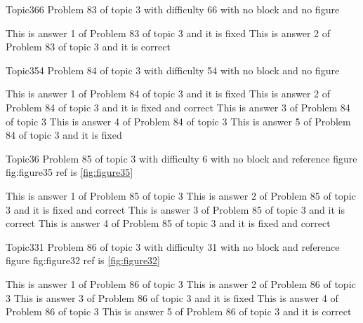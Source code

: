 \documentclass[master]{exam}
\begin{document}
\begin{problem}{Topic3}{66}
	Problem 83 of topic 3 with difficulty 66 with no block and no figure
	\begin{answers}
		\answer[fixed] This is answer 1 of Problem 83 of topic 3 and it is fixed
		\answer[correct] This is answer 2 of Problem 83 of topic 3 and it is correct
	\end{answers}
\end{problem}

\begin{problem}{Topic3}{54}
	Problem 84 of topic 3 with difficulty 54 with no block and no figure
	\begin{answers}
		\answer[fixed] This is answer 1 of Problem 84 of topic 3 and it is fixed
		 This is answer 2 of Problem 84 of topic 3 and it is fixed and correct
		\answer This is answer 3 of Problem 84 of topic 3 
		\answer This is answer 4 of Problem 84 of topic 3 
		\answer[fixed] This is answer 5 of Problem 84 of topic 3 and it is fixed
	\end{answers}
\end{problem}

\begin{problem}{Topic3}{6}
	Problem 85 of topic 3 with difficulty 6 with no block and reference figure fig:figure35 ref is \ref{fig:figure35}
	\begin{answers}
		\answer This is answer 1 of Problem 85 of topic 3 
		 This is answer 2 of Problem 85 of topic 3 and it is fixed and correct
		\answer[correct] This is answer 3 of Problem 85 of topic 3 and it is correct
		 This is answer 4 of Problem 85 of topic 3 and it is fixed and correct
	\end{answers}
\end{problem}

\begin{problem}{Topic3}{31}
	Problem 86 of topic 3 with difficulty 31 with no block and reference figure fig:figure32 ref is \ref{fig:figure32}
	\begin{answers}
		\answer This is answer 1 of Problem 86 of topic 3 
		\answer This is answer 2 of Problem 86 of topic 3 
		\answer[fixed] This is answer 3 of Problem 86 of topic 3 and it is fixed
		\answer This is answer 4 of Problem 86 of topic 3 
		\answer[correct] This is answer 5 of Problem 86 of topic 3 and it is correct
	\end{answers}
\end{problem}
\end{document}
